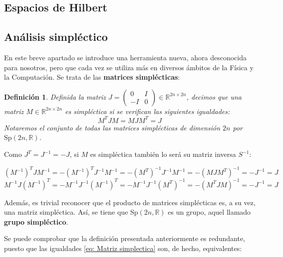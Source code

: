 \documentclass[11pt,a4paper,twoside,pdf]{article}
\numberwithin{equation}{section}
\newtheorem{definition}{Definición}
\begin{document}
		\subsection{Espacios de Hilbert}

		\subsection{Análisis simpléctico}
				
		En este breve apartado se introduce una herramienta nueva, ahora desconocida para nosotros, pero que cada vez se utiliza más en diversos ámbitos de la Física y la Computación. Se trata de las \textbf{matrices simplécticas}:

			\begin{definition}\label{def: Matriz simplectica}
			Definida la matriz $J = \left(\begin{array}{cc}0 & I\\-I & 0\end{array}\right) \in \mathbb{R}^{2n\times 2n}$,  decimos que una matriz $M \in \mathbb{R}^{2n\times 2n}$ es simpléctica si se verifican las siguientes igualdades:
					\begin{equation} \label{eq: Matriz simplectica}
								M^T J M =  M J M^T = J
					\end{equation}
			Notaremos el conjunto de todas las matrices simplécticas de dimensión $2n$ por $\text{Sp}(2n,\mathbb{R})$.    
			\end{definition}

		\noindent Como $J^T=J^{-1}=-J$, si $M$ es simpléctica también lo será su matriz inversa $S^{-1}$:

			\begin{center}
				$(M^{-1})^T J M^{-1} = - (M^{-1})^T J^{-1} M^{-1} = -(M^T)^{-1}J^{-1}M^{-1} = -(MJM^T)^{-1} = -J^{-1} =J$
				$M^{-1} J (M^{-1})^T = - M^{-1} J^{-1} (M^{-1})^T = -M^{-1}J^{-1}(M^T)^{-1}= -(M^TJM)^{-1} = -J^{-1} =J$
			\end{center}

		\noindent Además, es trivial reconocer que el producto de matrices simplécticas es, a su vez, una matriz simpléctica. Así, se tiene que $\text{Sp}(2n, \mathbb{R})$ es un grupo, aquel llamado \textbf{grupo simpléctico}.    

		\noindent Se puede comprobar que la definición presentada anteriormente es redundante, puesto que las igualdades \ref{eq: Matriz simplectica} son, de hecho, equivalentes:
		
\end{document}
